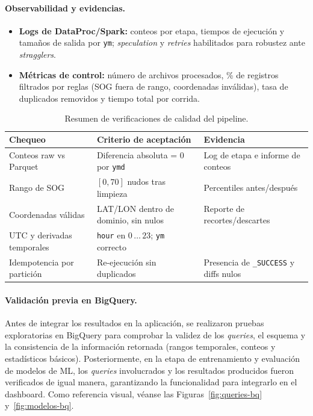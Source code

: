 \documentclass[10pt]{article}
\begin{document}
\paragraph{Observabilidad y evidencias.}
\begin{itemize}
  \item \textbf{Logs de DataProc/Spark:} conteos por etapa, tiempos de ejecución y tamaños de salida por \texttt{ym}; \emph{speculation} y \emph{retries} habilitados para robustez ante \emph{stragglers}.
  \item \textbf{Métricas de control:} número de archivos procesados, \% de registros filtrados por reglas (SOG fuera de rango, coordenadas inválidas), tasa de duplicados removidos y tiempo total por corrida.
\end{itemize}

\begin{table}[H]
  \centering
  \caption{Resumen de verificaciones de calidad del pipeline.}
  \scriptsize
  \begin{tabular}{@{}p{4cm}p{5.5cm}p{4.5cm}@{}}
    \toprule
    \textbf{Chequeo} & \textbf{Criterio de aceptación} & \textbf{Evidencia} \\
    \midrule
    Conteos raw vs Parquet & Diferencia absoluta = 0 por \texttt{ymd} & Log de etapa e informe de conteos \\
    Rango de SOG & \([0,70]\) nudos tras limpieza & Percentiles antes/después \\
    Coordenadas válidas & LAT/LON dentro de dominio, sin nulos & Reporte de recortes/descartes \\
    UTC y derivadas temporales & \texttt{hour} en \(0\,\ldots\,23\); \texttt{ym} correcto \\
    Idempotencia por partición & Re-ejecución sin duplicados & Presencia de \texttt{\_SUCCESS} y diffs nulos \\
    \bottomrule
  \end{tabular}
\end{table}

\paragraph{Validación previa en BigQuery.}
Antes de integrar los resultados en la aplicación, se realizaron pruebas exploratorias en BigQuery para comprobar la validez de los \textit{queries}, el esquema y la consistencia de la información retornada (rangos temporales, conteos y estadísticos básicos). Posteriormente, en la etapa de entrenamiento y evaluación de modelos de ML, los \textit{queries} involucrados y los resultados producidos fueron verificados de igual manera, garantizando la funcionalidad para integrarlo en el dashboard. Como referencia visual, véanse las Figuras~\ref{fig:queries-bq} y~\ref{fig:modelos-bq}.
\end{document}
